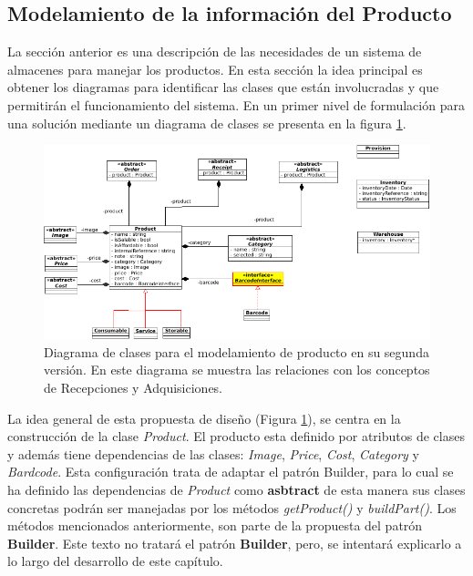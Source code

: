 {\subsection{Modelamiento de la información del Producto}

La sección anterior es una descripción de las necesidades de un sistema de almacenes para manejar los productos. En esta sección la idea principal es obtener los diagramas para identificar las clases que están involucradas y que permitirán el funcionamiento del sistema. En un primer nivel de formulación para una solución mediante un diagrama de clases se presenta en la figura \ref{Product-classes-v2}.

\begin{figure}
  \centering
    \includegraphics[scale=0.7]{./Capitulo3/figs/ADDStock-product-v2.png}
  \caption{Diagrama de clases para el modelamiento de producto en su segunda versión. En este diagrama se muestra las relaciones con los conceptos de Recepciones y Adquisiciones.}
  \label{Product-classes-v2}
\end{figure}

La idea general de esta propuesta de diseño (Figura \ref{Product-classes-v2}), se centra en la construcción de la clase \textit{Product}. El producto esta definido por atributos de clases y además tiene dependencias de las clases: \textit{Image}, \textit{Price}, \textit{Cost}, \textit{Category} y \textit{Bardcode}. Esta configuración trata de adaptar el patrón Builder, para lo cual se ha definido las dependencias de \textit{Product} como \textbf{asbtract} de esta manera sus clases concretas podrán ser manejadas por los métodos \textit{getProduct()} y \textit{buildPart()}. Los métodos mencionados anteriormente, son parte de la propuesta del patrón \textbf{Builder}. Este texto no tratará el patrón \textbf{Builder}, pero, se intentará explicarlo a lo largo del desarrollo de este capítulo.\\

}

